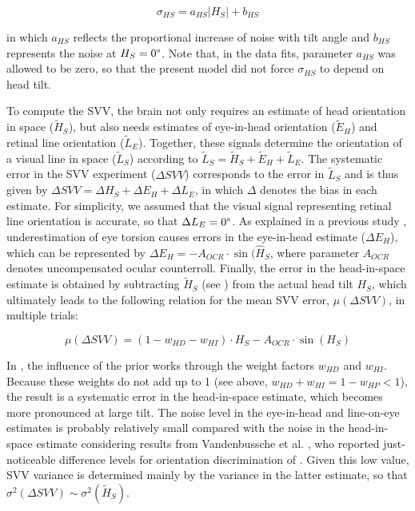 \begin{equation}
\label{p1:eqn11}
\sigma_{HS} = a_{HS} |H_S| + b_{HS}
\end{equation}

in which $a_{HS}$ reflects the proportional increase of noise with tilt angle and $b_{HS}$ represents the noise at $H_{S} = 0\degree$. Note that, in the data fits, parameter $a_{HS}$ was allowed to be zero, so that the present model did not force $\sigma_{HS}$ to depend on head tilt. 

To compute the SVV, the brain not only requires an estimate of head orientation in space ($\tilde{H}_S$), but also needs estimates of eye-in-head orientation ($\tilde{E}_H$) and retinal line orientation ($\tilde{L}_E$). Together, these signals determine the orientation of a visual line in space ($\tilde{L}_S$) according to $\tilde{L}_S = \tilde{H}_S + \tilde{E}_H + \tilde{L}_E$. The systematic error in the SVV experiment (${\Delta}SVV$) corresponds to the error in $\tilde{L}_S$ and is thus given by ${\Delta}SVV = {\Delta}H_S + {\Delta}E_H + {\Delta}L_E$, in which $\Delta$ denotes the bias in each estimate. For simplicity, we assumed that the visual signal representing retinal line orientation is accurate, so that ${\Delta}L_E = 0\degree$. As explained in a previous study \cite{devrijer2009}, underestimation of eye torsion causes errors in the eye-in-head estimate (${\Delta}E_H$), which can be represented by ${\Delta}E_H = -A_{OCR} \cdot \sin(\hat{H}_S$, where parameter $A_{OCR}$ denotes uncompensated ocular counterroll. Finally, the error in the head-in-space estimate is obtained by subtracting $\tilde{H}_S$ (see ) from the actual head tilt $H_S$, which ultimately leads to the following relation for the mean SVV error, $\mu({\Delta}SVV)$, in multiple trials: 

\begin{equation}
\label{p1:eqn12}
\mu({\Delta}SVV) = (1 - w_{HD} - w_{HI}) \cdot H_S - A_{OCR} \cdot \sin(H_S)
\end{equation}

In , the influence of the prior works through the weight factors $w_{HD}$ and $w_{HI}$. Because these weights do not add up to 1 (see above, $w_{HD} + w_{HI} = 1 - w_{HP} < 1$), the result is a systematic error in the head-in-space estimate, which becomes more pronounced at large tilt. The noise level in the eye-in-head and line-on-eye estimates is probably relatively small compared with the noise in the head-in-space estimate considering results from Vandenbussche et al. \citeyear{vandenbussche1986}, who reported just-noticeable difference levels for orientation discrimination of . Given this low value, SVV variance is determined mainly by the variance in the latter estimate, so that $\sigma^2({\Delta}SVV) \sim \sigma^2(\tilde{H}_S)$.

